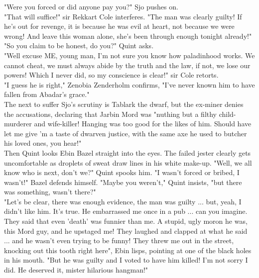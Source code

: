 "Were you forced or did anyone pay you?" Sjo pushes on.\\

"That will suffice!" sir Rekkart Cole interferes. "The man was clearly guilty! If he's out for revenge, it is because he was evil at heart, not because we were wrong! And leave this woman alone, she's been through enough tonight already!"\\

"So you claim to be honest, do you?" Quint asks.\\

"Well excuse ME, young man, I'm not sure you know how paladinhood works. We cannot cheat, we must always abide by the truth and the law, if not, we lose our powers! Which I never did, so my conscience is clear!" sir Cole retorts.\\

"I guess he is right," Zenobia Zenderholm confirms, "I've never known him to have fallen from Abadar's grace."\\

The next to suffer Sjo's scrutiny is Tablark the dwarf, but the ex-miner denies the accusations, declaring that Jarbin Mord was "nuthing but a filthy child-murderer and wife-killer! Hanging was too good for the likes of him. Should have let me give 'm a taste of dwarven justice, with the same axe he used to butcher his loved ones, you hear!"\\

Then Quint looks Ebin Bazel straight into the eyes. The failed jester clearly gets uncomfortable as droplets of sweat draw lines in his white make-up. "Well, we all know who is next, don't we?" Quint spooks him. "I wasn't forced or bribed, I wasn't!" Bazel defends himself. "Maybe you weren't," Quint insists, "but there was something, wasn't there?"\\

"Let's be clear, there was enough evidence, the man was guilty ... but, yeah, I didn't like him. It's true. He embarrassed me once in a pub ... can you imagine. They said that even 'death' was funnier than me. A stupid, ugly moron he was, this Mord guy, and he upstaged me! They laughed and clapped at what he said ... and he wasn't even trying to be funny! They threw me out in the street, knocking out this tooth right here", Ebin lisps, pointing at one of the black holes in his mouth. "But he was guilty and I voted to have him killed! I'm not sorry I did. He deserved it, mister hilarious hangman!"\\

